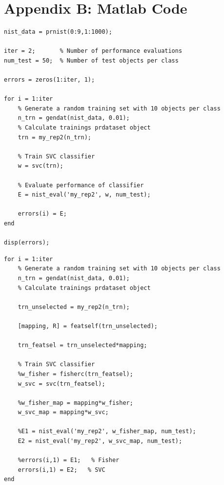 \documentclass{article}
\begin{document}
\clearpage

\section{Appendix B: Matlab Code}

\begin{lstlisting}[caption=Script for performance evaluation,label=code:eval-script-scenario]
nist_data = prnist(0:9,1:1000);

iter = 2;       % Number of performance evaluations
num_test = 50;  % Number of test objects per class

errors = zeros(1:iter, 1);

for i = 1:iter
    % Generate a random training set with 10 objects per class 
    n_trn = gendat(nist_data, 0.01);
    % Calculate trainings prdataset object
    trn = my_rep2(n_trn);
    
    % Train SVC classifier
    w = svc(trn);
    
    % Evaluate performance of classifier
    E = nist_eval('my_rep2', w, num_test);
    
    errors(i) = E;
end

disp(errors);
\end{lstlisting}

\begin{lstlisting}[caption=Script for performance evaluation with feature selection,label=code:scenario2-test-featsel]
for i = 1:iter
    % Generate a random training set with 10 objects per class 
    n_trn = gendat(nist_data, 0.01);
    % Calculate trainings prdataset object

    trn_unselected = my_rep2(n_trn);

    [mapping, R] = featself(trn_unselected);

    trn_featsel = trn_unselected*mapping;

    % Train SVC classifier
    %w_fisher = fisherc(trn_featsel);
    w_svc = svc(trn_featsel);
    
    %w_fisher_map = mapping*w_fisher;
    w_svc_map = mapping*w_svc;
    
    %E1 = nist_eval('my_rep2', w_fisher_map, num_test);
    E2 = nist_eval('my_rep2', w_svc_map, num_test);
    
    %errors(i,1) = E1;   % Fisher
    errors(i,1) = E2;   % SVC
end
\end{lstlisting}





\nocite{*}

\end{document}

